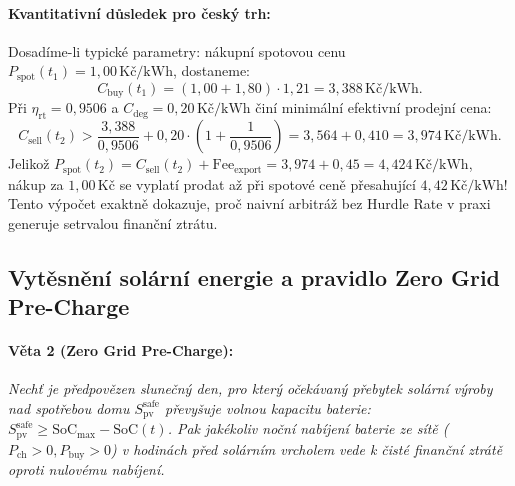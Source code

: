 \documentclass[FM,BP]{tulthesis}
\begin{document}
	\paragraph{Kvantitativní důsledek pro český trh:}
	Dosadíme-li typické parametry: nákupní spotovou cenu $P_{\text{spot}}(t_1) = 1{,}00\,\text{Kč/kWh}$, dostaneme:
	\begin{equation}
		C_{\text{buy}}(t_1) = (1{,}00 + 1{,}80) \cdot 1{,}21 = 3{,}388\,\text{Kč/kWh}.
	\end{equation}
	Při $\eta_{\text{rt}} = 0{,}9506$ a $C_{\text{deg}} = 0{,}20\,\text{Kč/kWh}$ činí minimální efektivní prodejní cena:
	\begin{equation}
		C_{\text{sell}}(t_2) > \frac{3{,}388}{0{,}9506} + 0{,}20 \cdot \left( 1 + \frac{1}{0{,}9506} \right) = 3{,}564 + 0{,}410 = 3{,}974\,\text{Kč/kWh}.
	\end{equation}
	Jelikož $P_{\text{spot}}(t_2) = C_{\text{sell}}(t_2) + \text{Fee}_{\text{export}} = 3{,}974 + 0{,}45 = 4{,}424\,\text{Kč/kWh}$, nákup za $1{,}00\,\text{Kč}$ se vyplatí prodat až při spotové ceně přesahující $4{,}42\,\text{Kč/kWh}$!
	Tento výpočet exaktně dokazuje, proč naivní arbitráž bez Hurdle Rate v praxi generuje setrvalou finanční ztrátu.

	\subsection{Vytěsnění solární energie a pravidlo Zero Grid Pre-Charge}

	\paragraph{Věta 2 (Zero Grid Pre-Charge):}
	\textit{Nechť je předpovězen slunečný den, pro který očekávaný přebytek solární výroby nad spotřebou domu $S_{\text{pv}}^{\text{safe}}$ převyšuje volnou kapacitu baterie: $S_{\text{pv}}^{\text{safe}} \ge \mathrm{SoC}_{\max} - \mathrm{SoC}(t)$. Pak jakékoliv noční nabíjení baterie ze sítě ($P_{\text{ch}} > 0, P_{\text{buy}} > 0$) v hodinách před solárním vrcholem vede k čisté finanční ztrátě oproti nulovému nabíjení.}
\end{document}
